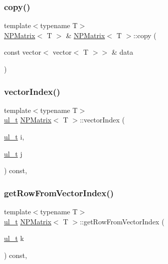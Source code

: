 \subsubsection{\texorpdfstring{copy()}{copy()}\hspace{0.1cm}{\footnotesize\ttfamily [2/2]}}
{\footnotesize\ttfamily template$<$typename T$>$ \\
\mbox{\hyperlink{class_n_p_matrix}{N\+P\+Matrix}}$<$ T $>$ \& \mbox{\hyperlink{class_n_p_matrix}{N\+P\+Matrix}}$<$ T $>$\+::copy (\begin{DoxyParamCaption}\item[{const vector$<$ vector$<$ T $>$$>$ \&}]{data }\end{DoxyParamCaption})\hspace{0.3cm}{\ttfamily [protected]}}

\mbox{\label{class_n_p_matrix_a1edc980b44c5b898ba3feb7d4f5ab625}} 
\subsubsection{\texorpdfstring{vectorIndex()}{vectorIndex()}}
{\footnotesize\ttfamily template$<$typename T$>$ \\
\mbox{\hyperlink{typedef_8h_a1b140a2034db3f5dfe18a987745df43a}{ul\+\_\+t}} \mbox{\hyperlink{class_n_p_matrix}{N\+P\+Matrix}}$<$ T $>$\+::vector\+Index (\begin{DoxyParamCaption}\item[{\mbox{\hyperlink{typedef_8h_a1b140a2034db3f5dfe18a987745df43a}{ul\+\_\+t}}}]{i,  }\item[{\mbox{\hyperlink{typedef_8h_a1b140a2034db3f5dfe18a987745df43a}{ul\+\_\+t}}}]{j }\end{DoxyParamCaption}) const\hspace{0.3cm}{\ttfamily [inline]}, {\ttfamily [protected]}}

\mbox{\label{class_n_p_matrix_aa8f30ca3523d088186e8320f9e21b772}} 
\subsubsection{\texorpdfstring{getRowFromVectorIndex()}{getRowFromVectorIndex()}}
{\footnotesize\ttfamily template$<$typename T$>$ \\
\mbox{\hyperlink{typedef_8h_a1b140a2034db3f5dfe18a987745df43a}{ul\+\_\+t}} \mbox{\hyperlink{class_n_p_matrix}{N\+P\+Matrix}}$<$ T $>$\+::get\+Row\+From\+Vector\+Index (\begin{DoxyParamCaption}\item[{\mbox{\hyperlink{typedef_8h_a1b140a2034db3f5dfe18a987745df43a}{ul\+\_\+t}}}]{k }\end{DoxyParamCaption}) const\hspace{0.3cm}{\ttfamily [inline]}, {\ttfamily [protected]}}

